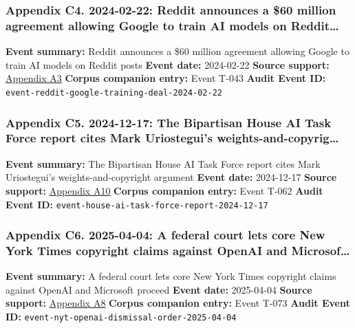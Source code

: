\documentclass[
  american,
  11pt,
  letterpaper,
]{article}
\begin{document}
\subsubsection{Appendix C4. 2024-02-22: Reddit announces a \$60 million
agreement allowing Google to train AI models on
Reddit\ldots{}}\label{appendix-c4-2024-02-22-reddit-announces-a-60-million-agreement-allowing-google-to-train-ai-models-on-reddit-posts}

\textbf{Event summary:} Reddit announces a \$60 million agreement
allowing Google to train AI models on Reddit posts \textbf{Event date:}
2024-02-22 \textbf{Source support:}
\hyperref[appendix-a3-reddit-strikes-60m-deal-allowing-google-to-train-ai-models-on-its-posts-unveils-ipo-plans]{Appendix
A3} \textbf{Corpus companion entry:} Event T-043 \textbf{Audit Event
ID:} \texttt{event-reddit-google-training-deal-2024-02-22}

\subsubsection{Appendix C5. 2024-12-17: The Bipartisan House AI Task
Force report cites Mark Uriostegui's
weights-and-copyrig\ldots{}}\label{appendix-c5-2024-12-17-the-bipartisan-house-ai-task-force-report-cites-mark-uriostegui-s-weights-and-copyright-argument}

\textbf{Event summary:} The Bipartisan House AI Task Force report cites
Mark Uriostegui's weights-and-copyright argument \textbf{Event date:}
2024-12-17 \textbf{Source support:}
\hyperref[appendix-a10-bipartisan-house-task-force-report-on-artificial-intelligence]{Appendix
A10} \textbf{Corpus companion entry:} Event T-062 \textbf{Audit Event
ID:} \texttt{event-house-ai-task-force-report-2024-12-17}

\subsubsection{Appendix C6. 2025-04-04: A federal court lets core New
York Times copyright claims against OpenAI and
Microsof\ldots{}}\label{appendix-c6-2025-04-04-a-federal-court-lets-core-new-york-times-copyright-claims-against-openai-and-microsoft-proceed}

\textbf{Event summary:} A federal court lets core New York Times
copyright claims against OpenAI and Microsoft proceed \textbf{Event
date:} 2025-04-04 \textbf{Source support:}
\hyperref[appendix-a8-the-new-york-times-company-v-microsoft-corporation-et-al-opinion-on-motions-to-dismiss]{Appendix
A8} \textbf{Corpus companion entry:} Event T-073 \textbf{Audit Event
ID:} \texttt{event-nyt-openai-dismissal-order-2025-04-04}
\end{document}
